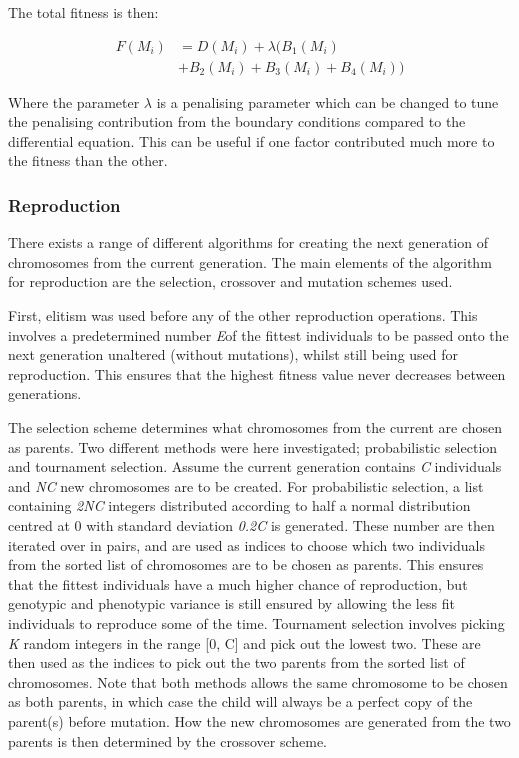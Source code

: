 \documentclass[multicolumn, 10pt]{extarticle}
\begin{document}
The total fitness is then:

\begin{align*}
	F(M_{i}) & = D(M_{i}) + \lambda  ( B_1(M_{i})            \\
	         & +  B_2(M_{i})  +  B_3(M_{i})  + B_4(M_{i})  )
\end{align*}

Where the parameter $\lambda$ is a penalising parameter which can be changed to tune the penalising contribution from the boundary conditions compared to the differential equation. This can be useful if one factor contributed much more to the fitness than the other.

\subsubsection{Reproduction}
There exists a range of different algorithms for creating the next generation of chromosomes from the current generation. The main elements  of the algorithm for reproduction are the selection, crossover and mutation schemes used.

First, elitism was used before any of the other reproduction operations. This involves a predetermined number  \textit{E}of the fittest individuals to be passed onto the next generation unaltered (without mutations), whilst still being used for reproduction. This ensures that the highest fitness value never decreases between generations.

The selection scheme determines what chromosomes from the current are chosen as parents. Two different methods were here investigated; probabilistic selection and tournament selection. Assume the current generation contains \textit{C} individuals and \textit{NC} new chromosomes are to be created. For probabilistic selection, a list containing \textit{2NC} integers distributed according to half a normal distribution centred at 0 with standard deviation \textit{0.2C} is generated. These number are then iterated over in pairs, and are used as indices to choose which two individuals from the sorted list of chromosomes are to be chosen as parents. This ensures that the fittest individuals have a much higher chance of reproduction, but genotypic and phenotypic variance is still ensured by allowing the less fit individuals to reproduce some of the time. Tournament selection involves picking \textit{K} random integers in the range [0, C] and pick out the lowest two. These are then used as the indices to pick out the two parents from the sorted list of chromosomes. Note that both methods allows the same chromosome to be chosen as both parents, in which case the child will always be a perfect copy of the parent(s) before mutation. How the new chromosomes are generated from the two parents is then determined by the crossover scheme.
\end{document}
